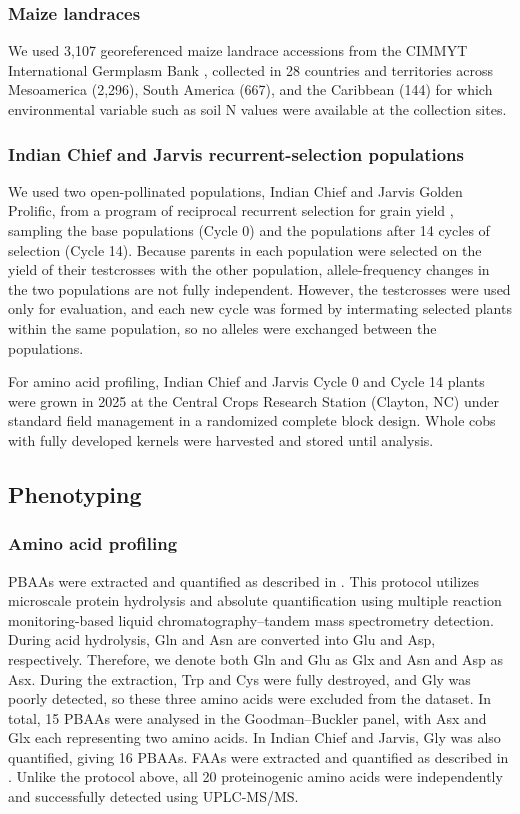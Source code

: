 \subsubsection{Maize landraces}
We used 3,107 georeferenced maize landrace accessions from the CIMMYT International Germplasm Bank \citep{RomeroNavarro2017Landraces}, collected in 28 countries and territories across Mesoamerica (2,296), South America (667), and the Caribbean (144) for which environmental variable such as soil N values were available at the collection sites.

\subsubsection{Indian Chief and Jarvis recurrent-selection populations}
We used two open-pollinated populations, Indian Chief and Jarvis Golden Prolific, from a program of reciprocal recurrent selection for grain yield \citep{MollStuber1971,Moll1994}, sampling the base populations (Cycle 0) and the populations after 14 cycles of selection (Cycle 14). Because parents in each population were selected on the yield of their testcrosses with the other population, allele-frequency changes in the two populations are not fully independent. However, the testcrosses were used only for evaluation, and each new cycle was formed by intermating selected plants within the same population, so no alleles were exchanged between the populations.

For amino acid profiling, Indian Chief and Jarvis Cycle 0 and Cycle 14 plants were grown in 2025 at the Central Crops Research Station (Clayton, NC) under standard field management in a randomized complete block design. Whole cobs with fully developed kernels were harvested and stored until analysis.

\subsection{Phenotyping}

\subsubsection{Amino acid profiling}
PBAAs were extracted and quantified as described in \cite{Yobi2018PBAA}. This protocol utilizes microscale protein hydrolysis and absolute quantification using multiple reaction monitoring-based liquid chromatography–tandem mass spectrometry detection. During acid hydrolysis, Gln and Asn are converted into Glu and Asp, respectively. Therefore, we denote both Gln and Glu as Glx and Asn and Asp as Asx. During the extraction, Trp and Cys were fully destroyed, and Gly was poorly detected, so these three amino acids were excluded from the dataset. In total, 15 PBAAs were analysed in the Goodman--Buckler panel, with Asx and Glx each representing two amino acids. In Indian Chief and Jarvis, Gly was also quantified, giving 16 PBAAs. FAAs were extracted and quantified as described in \citet{Gu2007LCMS}. Unlike the protocol above, all 20 proteinogenic amino acids were independently and successfully detected using UPLC-MS/MS.

